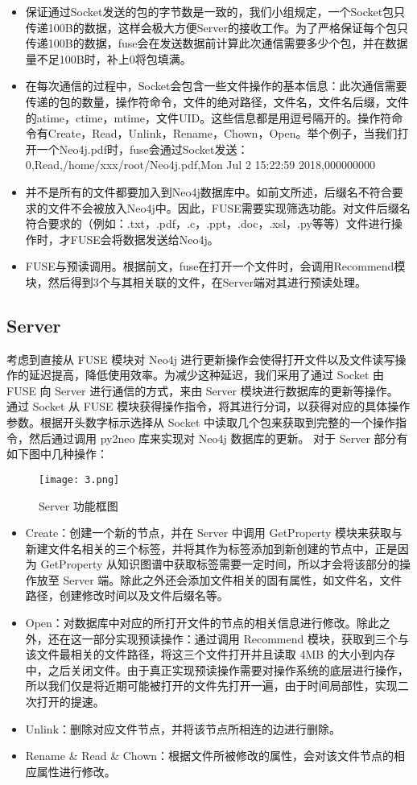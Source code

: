 \documentclass[UTF8]{ctexart}
\begin{document}
\begin{itemize}
	\item 保证通过Socket发送的包的字节数是一致的，我们小组规定，一个Socket包只传递100B的数据，这样会极大方便Server的接收工作。为了严格保证每个包只传递100B的数据，fuse会在发送数据前计算此次通信需要多少个包，并在数据量不足100B时，补上0将包填满。
	\item 在每次通信的过程中，Socket会包含一些文件操作的基本信息：此次通信需要传递的包的数量，操作符命令，文件的绝对路径，文件名，文件名后缀，文件的atime，ctime，mtime，文件UID。这些信息都是用逗号隔开的。操作符命令有Create，Read，Unlink，Rename，Chown，Open。举个例子，当我们打开一个Neo4j.pdf时，fuse会通过Socket发送：0,Read,/home/xxx/root/Neo4j.pdf,Mon Jul  2 15:22:59 2018,000000000
	\item 并不是所有的文件都要加入到Neo4j数据库中。如前文所述，后缀名不符合要求的文件不会被放入Neo4j中。因此，FUSE需要实现筛选功能。对文件后缀名符合要求的（例如：.txt，.pdf，.c，.ppt，.doc，.xsl，.py等等）文件进行操作时，才FUSE会将数据发送给Neo4j。
	\item FUSE与预读调用。根据前文，fuse在打开一个文件时，会调用Recommend模块，然后得到3个与其相关联的文件，在Server端对其进行预读处理。
 \end{itemize}

\subsection{Server}
考虑到直接从 FUSE 模块对 Neo4j 进行更新操作会使得打开文件以及文件读写操作的延迟提高，降低使用效率。为减少这种延迟，我们采用了通过 Socket 由 FUSE 向 Server 进行通信的方式，来由 Server 模块进行数据库的更新等操作。
通过 Socket 从 FUSE 模块获得操作指令，将其进行分词，以获得对应的具体操作参数。根据开头数字标示选择从 Socket 中读取几个包来获取到完整的一个操作指令，然后通过调用 py2neo 库来实现对 Neo4j 数据库的更新。
对于 Server 部分有如下图中几种操作：

\begin{figure}
\centering\texttt{[image: 3.png]}
\caption{Server 功能框图}
\end{figure}

\begin{itemize}
	\item Create：创建一个新的节点，并在 Server 中调用 GetProperty 模块来获取与新建文件名相关的三个标签，并将其作为标签添加到新创建的节点中，正是因为 GetProperty 从知识图谱中获取标签需要一定时间，所以才会将该部分的操作放至 Server 端。除此之外还会添加文件相关的固有属性，如文件名，文件路径，创建修改时间以及文件后缀名等。
	\item Open：对数据库中对应的所打开文件的节点的相关信息进行修改。除此之外，还在这一部分实现预读操作：通过调用 Recommend 模块，获取到三个与该文件最相关的文件路径，将这三个文件打开并且读取 4MB 的大小到内存中，之后关闭文件。由于真正实现预读操作需要对操作系统的底层进行操作，所以我们仅是将近期可能被打开的文件先打开一遍，由于时间局部性，实现二次打开的提速。
	\item Unlink：删除对应文件节点，并将该节点所相连的边进行删除。
	\item Rename \& Read \& Chown：根据文件所被修改的属性，会对该文件节点的相应属性进行修改。
\end{itemize}
\end{document}
